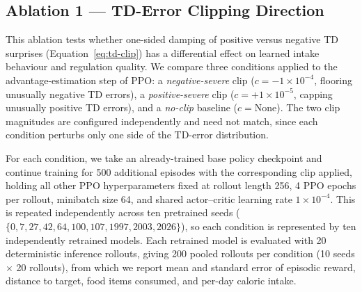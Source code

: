 \documentclass[10pt,twocolumn]{article}
\begin{document}
\begin{table}[t]
\centering
\caption{Per-nutrient reward and dynamics configuration.}
\label{tab:nutrient-config}
\end{table}

\subsection{Ablation 1 --- TD-Error Clipping Direction}
\label{sec:ablation1}

This ablation tests whether one-sided damping of positive versus negative TD surprises (Equation~\eqref{eq:td-clip}) has a differential effect on learned intake behaviour and regulation quality. We compare three conditions applied to the advantage-estimation step of PPO: a \emph{negative-severe} clip ($c=-1\times10^{-4}$, flooring unusually negative TD errors), a \emph{positive-severe} clip ($c=+1\times10^{-5}$, capping unusually positive TD errors), and a \emph{no-clip} baseline ($c=\text{None}$). The two clip magnitudes are configured independently and need not match, since each condition perturbs only one side of the TD-error distribution.

For each condition, we take an already-trained base policy checkpoint and continue training for 500 additional episodes with the corresponding clip applied, holding all other PPO hyperparameters fixed at rollout length 256, 4 PPO epochs per rollout, minibatch size 64, and shared actor--critic learning rate $1\times10^{-4}$. This is repeated independently across ten pretrained seeds ($\{0,7,27,42,64,100,107,1997,2003,2026\}$), so each condition is represented by ten independently retrained models. Each retrained model is evaluated with 20 deterministic inference rollouts, giving 200 pooled rollouts per condition (10 seeds $\times$ 20 rollouts), from which we report mean and standard error of episodic reward, distance to target, food items consumed, and per-day caloric intake.
\end{document}
